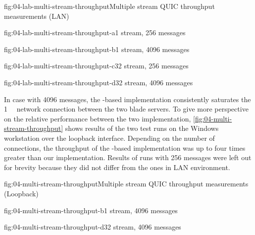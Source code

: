 \begin{myFigure}{fig:04-lab-multi-stream-throughput}{Multiple stream QUIC throughput measurements (LAN)}
\begin{mySubfigure}{0.49\linewidth}{fig:04-lab-multi-stream-throughput-a}{1 stream, \SI{256}{\byte} messages}
\footnotesize

\end{mySubfigure}
\begin{mySubfigure}{0.49\linewidth}{fig:04-lab-multi-stream-throughput-b}{1 stream, \SI{4096}{\byte} messages}
\footnotesize

\end{mySubfigure}

\begin{mySubfigure}{0.49\linewidth}{fig:04-lab-multi-stream-throughput-c}{32 stream, \SI{256}{\byte} messages}
\footnotesize

\end{mySubfigure}
\begin{mySubfigure}{0.49\linewidth}{fig:04-lab-multi-stream-throughput-d}{32 stream, \SI{4096}{\byte} messages}
\footnotesize

\end{mySubfigure}
\end{myFigure}

In case with \SI{4096}{\byte} messages, the \libmsquic{}-based implementation consistently saturates
the \SI{1}{\giga\bit} network connection between the two blade servers. To give more perspective on
the relative performance between the two implementation, \autoref{fig:04-multi-stream-throughput}
shows results of the two test runs on the Windows workstation over the loopback interface. Depending
on the number of connections, the throughput of the \libmsquic{}-based implementation was up to four
times greater than our implementation. Results of runs with \SI{256}{\byte} messages were left out
for brevity because they did not differ from the ones in LAN environment.

\begin{myFigure}{fig:04-multi-stream-throughput}{Multiple stream QUIC throughput measurements (Loopback)}
\begin{mySubfigure}{0.49\linewidth}{fig:04-multi-stream-throughput-b}{1 stream, \SI{4096}{\byte} messages}
\footnotesize

\end{mySubfigure}
\begin{mySubfigure}{0.49\linewidth}{fig:04-multi-stream-throughput-d}{32 stream, \SI{4096}{\byte} messages}
\footnotesize

\end{mySubfigure}
\end{myFigure}

